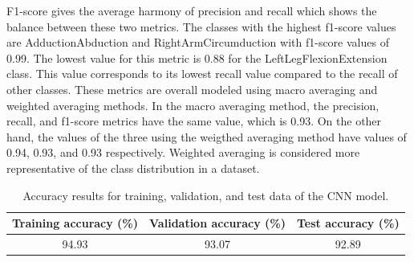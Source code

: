 F1-score gives the average harmony of precision and recall which shows the balance between these two metrics. The classes with the highest f1-score values are AdductionAbduction and RightArmCircumduction with f1-score values of 0.99. The lowest value for this metric is 0.88 for the LeftLegFlexionExtension class. This value corresponds to its lowest recall value compared to the recall of other classes. These metrics are overall modeled using macro averaging and weighted averaging methods. In the macro averaging method, the precision, recall, and f1-score metrics have the same value, which is 0.93. On the other hand, the values of the three using the weigthed averaging method have values of 0.94, 0.93, and 0.93 respectively. Weighted averaging is considered more representative of the class distribution in a dataset.

\begin{table}[h!]
	\caption{Accuracy results for training, validation, and test data of the CNN model.}
	\label{tab:LSTMAccuracy}
	\centering
	\begin{tabular}{|c|c|c|}
		\hline
		Training accuracy (\%) & Validation accuracy (\%) & Test accuracy (\%) \\ \hline
		94.93                  & 93.07                    & 92.89              \\ \hline
	\end{tabular}
\end{table}


